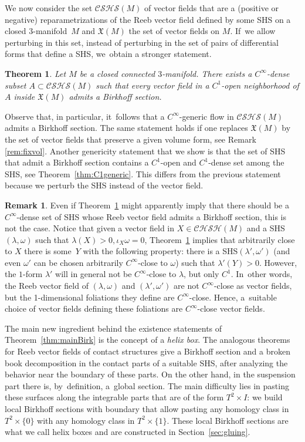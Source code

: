 \documentclass[10pt]{amsart}
\newcommand{\threemanifold}{$3$\nobreakdash-mani\-fold\xspace}
\newtheorem{thm}{Theorem}
\theoremstyle{definition}
\newtheorem{Remark}[theorem]{Remark}
\begin{document}
We now consider the set $\mathcal{CSHS}(M)$ of vector fields that are a (positive or negative) reparametrizations of the Reeb vector field defined by some SHS on a closed \threemanifold~$M$ and $\mathfrak{X}(M)$ the set of vector fields on $M$. If~we allow perturbing in this set, instead of perturbing in the set of pairs of differential forms that define a SHS, we~obtain a stronger statement.

\begin{thm}\label{thm:generic}
Let $M$ be a closed connected \threemanifold. There exists a $C^\infty$-dense subset $A\subset \mathcal{CSHS}(M)$ such that every vector field in a $C^1$-open neighborhood of $A$ inside $\mathfrak{X}(M)$ admits a Birkhoff section.
\end{thm}

Observe that, in particular, it~follows that a $C^\infty$-generic flow in $\mathcal{CSHS}(M)$ admits a Birkhoff section. The same statement holds if one replaces $\mathfrak{X}(M)$ by the set of vector fields that preserve a given volume form, see Remark \ref{rem:fixvol}. Another genericity statement that we show is that the set of SHS that admit a Birkhoff section contains a $C^1$-open and $C^1$-dense set among the SHS, see Theorem~\ref{thm:C1generic}. This differs from the previous statement because we perturb the SHS instead of the vector field.

\begin{Remark}
Even if Theorem~\ref{thm:generic} might apparently imply that there should be a $C^\infty$-dense set of SHS whose Reeb vector field admits a Birkhoff section, this is not the case. Notice that given a vector field in $X\in \mathcal{CHSH}(M)$ and a SHS $(\lambda,\omega)$ such that $\lambda(X)>0, \iota_X\omega=0$, Theorem~\ref{thm:generic} implies that arbitrarily close to $X$ there is some~$Y$ with the following property: there is a SHS$(\lambda',\omega')$ (and even $\omega'$ can be chosen arbitrarily $C^\infty$-close to $\omega$) such that $\lambda'(Y)>0$. However, the $1$-form $\lambda'$ will in general not be $C^\infty$-close to $\lambda$, but only $C^1$. In~other words, the Reeb vector field of $(\lambda,\omega)$ and $(\lambda',\omega')$ are not $C^\infty$-close as vector fields, but the 1-dimensional foliations they define are $C^\infty$-close. Hence, a~suitable choice of vector fields defining these foliations are $C^\infty$-close vector fields.
\end{Remark}

The main new ingredient behind the existence statements of Theorem~\ref{thm:mainBirk} is the concept of a \emph{helix box}. The analogous theorems for Reeb vector fields of contact structures give a Birkhoff section and a broken book decomposition in the contact parts of a suitable SHS, after analyzing the behavior near the boundary of these parts. On the other hand, in the suspension part there is, by~definition, a~global section. The main difficulty lies in pasting these surfaces along the integrable parts that are of the form $T^2\times I$: we build local Birkhoff sections with boundary that allow pasting any homology class in $T^2\times\{0\}$ with any homology class in $T^2\times\{1\}$. These local Birkhoff sections are what we call helix boxes and are constructed in Section~\ref{sec:gluing}.
\end{document}
